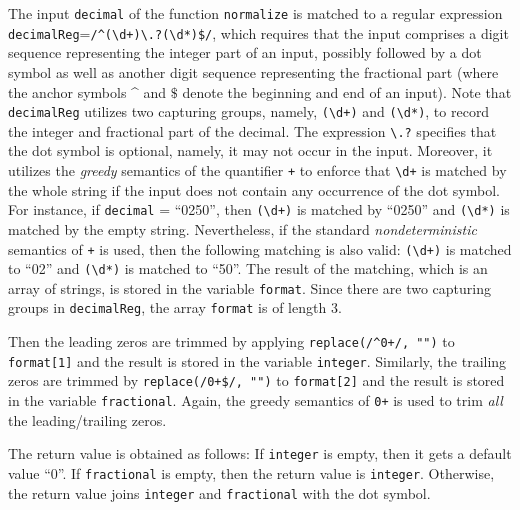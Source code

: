 The input {\tt decimal} of the function {\tt normalize} is matched to a regular expression {\tt decimalReg}={\tt /\^{}({\footnotesize\textbackslash}d+){\footnotesize\textbackslash}.?({\footnotesize\textbackslash}d*)\$/}, which requires that  the input comprises a digit sequence representing the integer part of an input, possibly followed by a dot symbol as well as another digit sequence representing the fractional part (where the anchor symbols \^{} and $\$$ denote the beginning and end of an input). Note that  {\tt decimalReg} utilizes two capturing groups, namely, {\tt ({\footnotesize\textbackslash}d+)} and {\tt ({\footnotesize\textbackslash}d*)}, to record the integer and fractional part of the decimal. The expression {\tt {\footnotesize\textbackslash}.?} specifies that the dot symbol is optional, namely, it may not occur in the input. Moreover, it utilizes the \emph{greedy} semantics of the quantifier {\tt +} to enforce that {\tt {\footnotesize\textbackslash}d+} is matched by the whole string if the input does not contain any occurrence of the dot symbol. For instance, if {\tt decimal} = ``0250'', then {\tt ({\footnotesize\textbackslash}d+)} is matched by ``0250'' and  {\tt ({\footnotesize\textbackslash}d*)} is matched by the empty string. 
Nevertheless, if the standard \emph{nondeterministic} semantics of {\tt +} is used, then the following matching is also valid: {\tt ({\footnotesize\textbackslash}d+)} is matched to ``02'' and {\tt ({\footnotesize\textbackslash}d*)} is matched to ``50''. The result of the matching, which is an array of strings, is stored in the variable {\tt format}. Since there are two capturing groups in {\tt decimalReg}, the array {\tt format} is of length 3.

Then the leading zeros are trimmed by applying {\tt replace(/\^{}0+/, "")} to {\tt format[1]} and the result is stored in the variable {\tt integer}. Similarly, the trailing zeros are trimmed by {\tt replace(/{}0+\$/, "")} to {\tt format[2]} and the result is stored in the variable {\tt fractional}. Again, the greedy semantics of {\tt 0+} is used to trim \emph{all} the leading/trailing zeros.

The return value is obtained as follows: If {\tt integer} is empty, then it gets a default value ``0''. If {\tt fractional} is empty, then the return value is {\tt integer}. Otherwise, the return value  joins {\tt integer} and {\tt fractional} with the dot symbol. 

